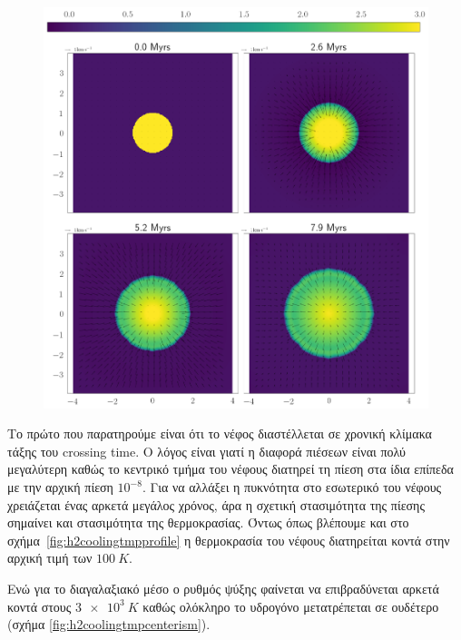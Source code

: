 	
\begin{figure}[h]
	\centering
	\includegraphics[width=1\linewidth]{DataImages/H2CoolingRHOquad}
	\caption{}
	\label{fig:h2coolingrhoquad}
\end{figure}


	Το πρώτο που παρατηρούμε είναι ότι το νέφος διαστέλλεται σε χρονική κλίμακα τάξης του crossing time. Ο λόγος είναι γιατί η διαφορά πιέσεων είναι πολύ μεγαλύτερη καθώς το κεντρικό τμήμα του νέφους διατηρεί τη πίεση στα ίδια επίπεδα με την αρχική πίεση $10^{-8}$. Για να αλλάξει η πυκνότητα στο εσωτερικό του νέφους χρειάζεται ένας αρκετά μεγάλος χρόνος, άρα η σχετική στασιμότητα της πίεσης σημαίνει και στασιμότητα της θερμοκρασίας. Όντως όπως βλέπουμε και στο σχήμα~\ref{fig:h2coolingtmpprofile} η θερμοκρασία του νέφους διατηρείται κοντά 
στην αρχική τιμή των $\SI{100}{K}$.

	Ενώ για το διαγαλαξιακό μέσο ο ρυθμός ψύξης φαίνεται να επιβραδύνεται αρκετά κοντά στους $\SI{3e3}{K}$ καθώς ολόκληρο το υδρογόνο μετατρέπεται σε ουδέτερο (σχήμα \ref{fig:h2coolingtmpcenterism}).


